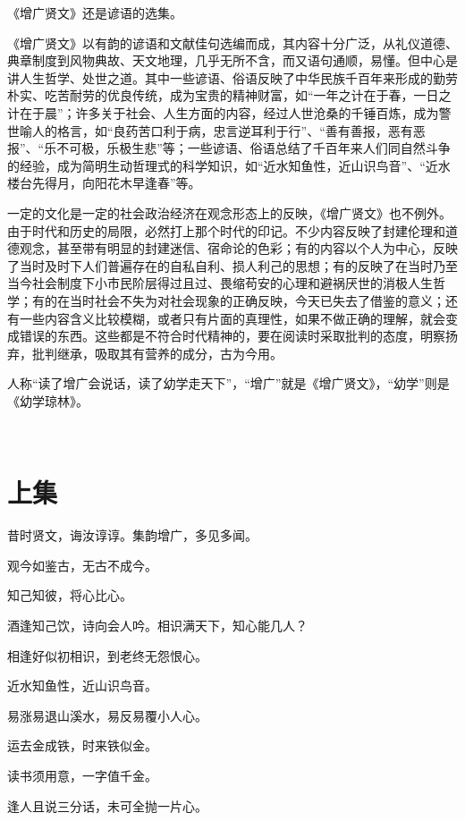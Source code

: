 \documentclass[12pt,UTF8]{ctexbook}
\begin{document}
《增广贤文》还是谚语的选集。

《增广贤文》以有韵的谚语和文献佳句选编而成，其内容十分广泛，从礼仪道德、典章制度到风物典故、天文地理，几乎无所不含，而又语句通顺，易懂。但中心是讲人生哲学、处世之道。其中一些谚语、俗语反映了中华民族千百年来形成的勤劳朴实、吃苦耐劳的优良传统，成为宝贵的精神财富，如“一年之计在于春，一日之计在于晨”；许多关于社会、人生方面的内容，经过人世沧桑的千锤百炼，成为警世喻人的格言，如“良药苦口利于病，忠言逆耳利于行”、“善有善报，恶有恶报”、“乐不可极，乐极生悲”等；一些谚语、俗语总结了千百年来人们同自然斗争的经验，成为简明生动哲理式的科学知识，如“近水知鱼性，近山识鸟音”、“近水楼台先得月，向阳花木早逢春”等。

一定的文化是一定的社会政治经济在观念形态上的反映，《增广贤文》也不例外。由于时代和历史的局限，必然打上那个时代的印记。不少内容反映了封建伦理和道德观念，甚至带有明显的封建迷信、宿命论的色彩；有的内容以个人为中心，反映了当时及时下人们普遍存在的自私自利、损人利己的思想；有的反映了在当时乃至当今社会制度下小市民阶层得过且过、畏缩苟安的心理和避祸厌世的消极人生哲学；有的在当时社会不失为对社会现象的正确反映，今天已失去了借鉴的意义；还有一些内容含义比较模糊，或者只有片面的真理性，如果不做正确的理解，就会变成错误的东西。这些都是不符合时代精神的，要在阅读时采取批判的态度，明察扬弃，批判继承，吸取其有营养的成分，古为今用。

人称“读了增广会说话，读了幼学走天下”，“增广”就是《增广贤文》，“幼学”则是《幼学琼林》。

\mainmatter

~\\

 \qquad  

\chapter{上集}

昔时贤文，诲汝谆谆。集韵增广，多见多闻。

观今如鉴古，无古不成今。

知己知彼，将心比心。

酒逢知己饮，诗向会人吟。相识满天下，知心能几人？

相逢好似初相识，到老终无怨恨心。

近水知鱼性，近山识鸟音。

易涨易退山溪水，易反易覆小人心。

运去金成铁，时来铁似金。

读书须用意，一字值千金。

逢人且说三分话，未可全抛一片心。
\end{document}
